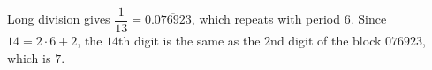 Long division gives $\dfrac{1}{13}=0.\overline{076923}$, which repeats with period $6$. Since $14=2\cdot6+2$, the $14$th digit is the same as the $2$nd digit of the block $076923$, which is $\boxed{7}$.
